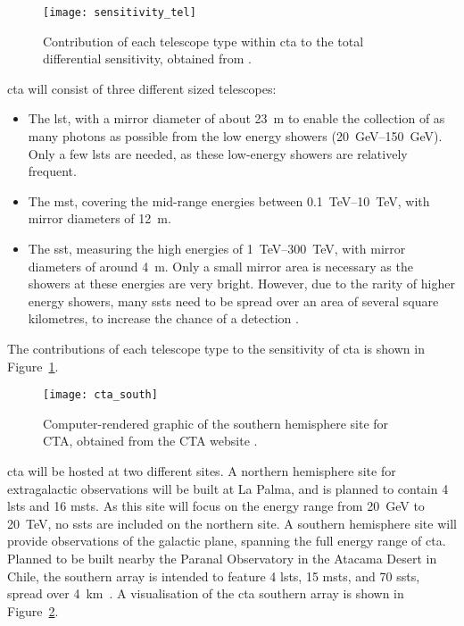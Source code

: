 \begin{figure}
	\centering\texttt{[image: sensitivity\_tel]} 
	\caption[Differential sensitivity of the different CTA telescope types.]{Contribution of each telescope type within \gls{cta} to the total differential sensitivity, obtained from \textcite{Marano2014}.}
	\label{fig:sensitivity_tel}
\end{figure}

\gls{cta} will consist of three different sized telescopes:
\begin{itemize}
\item The \gls{lst}, with a mirror diameter of about \SI{23}{m} to enable the collection of as many photons as possible from the low energy showers (\SIrange{20}{150}{GeV}). Only a few \glspl{lst} are needed, as these low-energy showers are relatively frequent.
\item The \gls{mst}, covering the mid-range energies between \SIrange{0.1}{10}{TeV}, with mirror diameters of \SI{12}{m}. 
\item The \gls{sst}, measuring the high energies of \SIrange{1}{300}{TeV}, with mirror diameters of around \SI{4}{m}. Only a small mirror area is necessary as the showers at these energies are very bright. However, due to the rarity of higher energy showers, many \glspl{sst} need to be spread over an area of several square kilometres, to increase the chance of a detection \cite{Acharya2013}.
\end{itemize}
The contributions of each telescope type to the sensitivity of \gls{cta} is shown in Figure~\ref{fig:sensitivity_tel}.

\begin{figure}
	\centering\texttt{[image: cta\_south]} 
	\caption[The southern-hemisphere Cherenkov Telescope Array.]{Computer-rendered graphic of the southern hemisphere site for CTA, obtained from the CTA website \cite{cta-south}.}
	\label{fig:cta_south}
\end{figure}

\gls{cta} will be hosted at two different sites. A northern hemisphere site for extragalactic observations will be built at La Palma, and is planned to contain 4 \glspl{lst} and 16 \glspl{mst}. As this site will focus on the energy range from \SI{20}{GeV} to \SI{20}{TeV}, no \glspl{sst} are included on the northern site. A southern hemisphere site will provide observations of the galactic plane, spanning the full energy range of \gls{cta}. Planned to be built nearby the Paranal Observatory in the Atacama Desert in Chile, the southern array is intended to feature 4 \glspl{lst}, 15 \glspl{mst}, and 70 \glspl{sst}, spread over \SI{4}{km \squared}. A visualisation of the \gls{cta} southern array is shown in Figure~\ref{fig:cta_south}.

